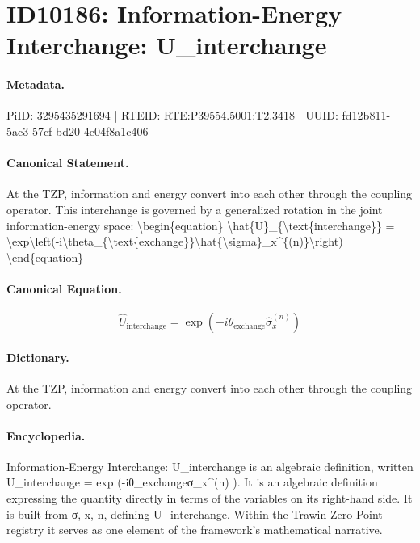 \section*{ID10186: Information-Energy Interchange: U\_interchange}
\paragraph{Metadata.}
PiID: 3295435291694 | RTEID: RTE:P39554.5001:T2.3418 | UUID: fd12b811-5ac3-57cf-bd20-4e04f8a1c406

\paragraph{Canonical Statement.}
At the TZP, information and energy convert into each other through the coupling operator. This interchange is governed by a generalized rotation in the joint information-energy space: \textbackslash{}begin\{equation\} \textbackslash{}hat\{U\}\_\{\textbackslash{}text\{interchange\}\} = \textbackslash{}exp\textbackslash{}left(-i\textbackslash{}theta\_\{\textbackslash{}text\{exchange\}\}\textbackslash{}hat\{\textbackslash{}sigma\}\_x\textasciicircum{}\{(n)\}\textbackslash{}right) \textbackslash{}end\{equation\}

\paragraph{Canonical Equation.}
\[
\hat{U}_{\text{interchange}} = \exp\left(-i\theta_{\text{exchange}}\hat{\sigma}_x^{(n)}\right)
\]

\paragraph{Dictionary.}
At the TZP, information and energy convert into each other through the coupling operator.

\paragraph{Encyclopedia.}
Information-Energy Interchange: U\_interchange is an algebraic definition, written U\_interchange = exp (-iθ\_exchangeσ\_x\textasciicircum{}(n) ). It is an algebraic definition expressing the quantity directly in terms of the variables on its right-hand side. It is built from σ, x, n, defining U\_interchange. Within the Trawin Zero Point registry it serves as one element of the framework's mathematical narrative.
